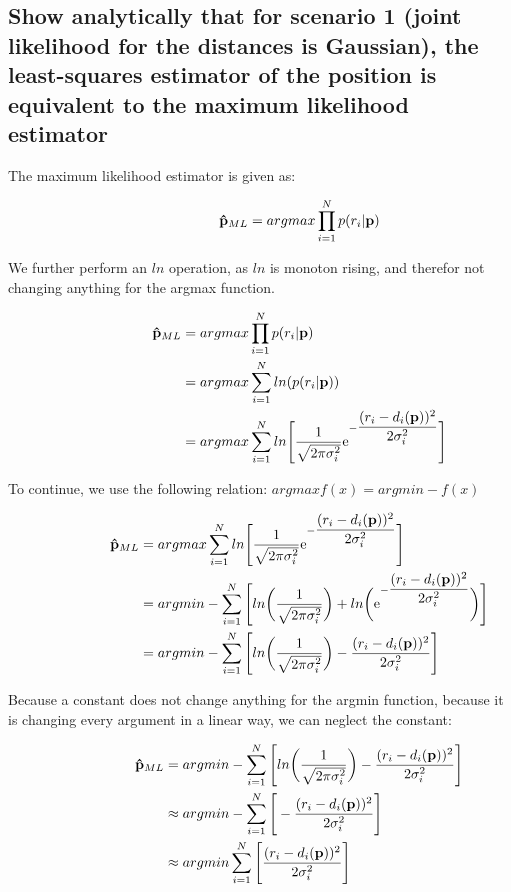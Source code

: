 \subsection{Show analytically that for scenario 1 (joint likelihood for the distances is Gaussian), the least-squares estimator of the position is equivalent to the maximum likelihood estimator}

The maximum likelihood estimator is given as:

\begin{align*}
\hspace*{2cm}
\mathbf{\hat{p}}_{ML} = argmax \prod\limits_{i=1}^N p(r_i|\mathbf{p})
\end{align*}

We further perform an $ln$ operation, as $ln$ is monoton rising, and therefor not changing anything for the argmax function.

\begin{align*}
\hspace*{2cm}
\mathbf{\hat{p}}_{ML} &= argmax \prod\limits_{i=1}^N p(r_i|\mathbf{p})\\ 
&= argmax \sum\limits_{i=1}^N ln(p(r_i|\mathbf{p}))\\
&= argmax \sum\limits_{i=1}^N ln\Bigg[\dfrac{1}{\sqrt{2\pi\sigma_i^2}} \exp{-\dfrac{(r_i-d_i(\mathbf{p}))^2}{2\sigma_i^2}}\Bigg]\\
\end{align*}

To continue, we use the following relation: 
$argmax f(x) = argmin - f(x)$

\begin{align*}
\hspace*{2cm}
\mathbf{\hat{p}}_{ML} &= argmax \sum\limits_{i=1}^N ln\Bigg[\dfrac{1}{\sqrt{2\pi\sigma_i^2}} \exp{-\dfrac{(r_i-d_i(\mathbf{p}))^2}{2\sigma_i^2}}\Bigg]\\
&= argmin - \sum\limits_{i=1}^N \Bigg[ln\bigg(\dfrac{1}{\sqrt{2\pi\sigma_i^2}}\bigg) + ln\bigg(\exp{-\dfrac{(r_i-d_i(\mathbf{p}))^2}{2\sigma_i^2}}\bigg)\Bigg]\\
&= argmin - \sum\limits_{i=1}^N \Bigg[ln\bigg(\dfrac{1}{\sqrt{2\pi\sigma_i^2}}\bigg) - \dfrac{(r_i-d_i(\mathbf{p}))^2}{2\sigma_i^2}\Bigg]\\
\end{align*}

Because a constant does not change anything for the argmin function, because it is changing every argument in a linear way, we can neglect the constant:

\begin{align*}
\hspace*{2cm}
\mathbf{\hat{p}}_{ML} &= argmin - \sum\limits_{i=1}^N \Bigg[ln\bigg(\dfrac{1}{\sqrt{2\pi\sigma_i^2}}\bigg) - \dfrac{(r_i-d_i(\mathbf{p}))^2}{2\sigma_i^2}\Bigg]\\
&\approx argmin - \sum\limits_{i=1}^N \Bigg[- \dfrac{(r_i-d_i(\mathbf{p}))^2}{2\sigma_i^2}\Bigg]\\ 
&\approx argmin  \sum\limits_{i=1}^N \Bigg[\dfrac{(r_i-d_i(\mathbf{p}))^2}{2\sigma_i^2}\Bigg]\\
\end{align*}

